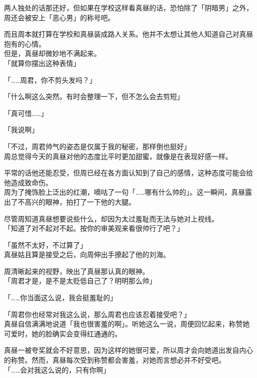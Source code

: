 两人独处的话那还好，但如果在学校这样看真昼的话，恐怕除了「阴暗男」之外，周还会被安上「恶心男」的称号吧。

而且周本就打算在学校和真昼装成路人关系。他并不太想让其他人知道自己对真昼抱有的心情。\\

但是，真昼却微妙地不满起来。\\

「就算你摆出这种表情」

「……周君，你不剪头发吗？」

「什么啊这么突然。有时会整理一下，但不怎么会去剪短」

「真可惜……」

「我说啊」

「不过，周君帅气的姿态是仅属于我的秘密，那样倒也挺好」\\

周总觉得今天的真昼对他的态度比平时更加甜蜜，就像是在表现好感一样。

平常的话他还能忍受，但周已经在各方面认知到了自己的感情，这种态度可能会给他造成致命伤。\\

周为了掩饰脸上泛出的红潮，嘀咕了一句「……哪有什么帅的」。这一瞬间，真昼露出了不高兴的眼神，拍打了一下他的大腿。

尽管周知道真昼想要说些什么，却因为太过羞耻而无法与她对上视线。\\

「知道了对不起对不起。按你的审美观来看很帅行了吧？」

「虽然不太好，不过算了」\\

真昼姑且算是接受之后，向周伸出手撩起了他的刘海。

周清晰起来的视野，映出了真昼那认真的眼神。\\

「周君才是，是不是太贬低自己了？明明那么帅」

「……你当面这么说，我会挺羞耻的」

「周君你也经常对我这么说，那么周君也应该忍着接受吧？」\\

真昼自信满满地说道「我也很害羞的啊」。听她这么一说，周便回忆起来，称赞她可爱时，她的脸确实会变得红通通的。

真昼一被夸奖就会不好意思，因为这样的她很可爱，所以周才会向她道出发自内心的称赞。然而，真昼每次受到称赞都会害羞，对她而言想必并不好受吧。\\

「……会对我这么说的，只有你啊」


